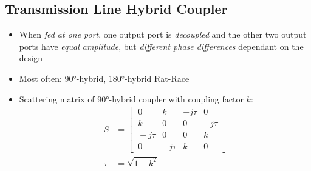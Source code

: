 \subsection{Transmission Line Hybrid Coupler}
\begin{itemize}
    \itemsep0pt
    \item When \textit{fed at one port}, one output port is \textit{decoupled} and the other two output ports have \textit{equal amplitude}, but \textit{different phase differences} dependant on the design
    \item Most often: \ang{90}-hybrid, \ang{180}-hybrid Rat-Race
    \item Scattering matrix of \ang{90}-hybrid coupler with coupling factor $k$:
        \begin{align*}
            S &=
            \begin{bmatrix}\
                0 & k & -j\tau & 0\\\
                k & 0 & 0 & -j\tau\\\
                -j\tau & 0 & 0 & k\\\
                0 & -j\tau & k & 0\
            \end{bmatrix}\\
            \tau &= \sqrt{1 - k^2}
        \end{align*}
\end{itemize}

